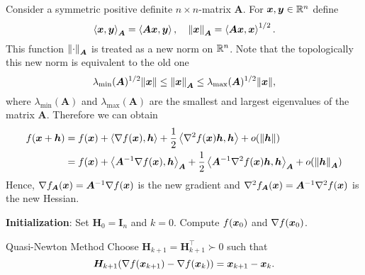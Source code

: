Consider a symmetric positive definite \(n \times n\)-matrix \(\bm{A}\). For \(\bm{x}, \bm{y} \in \mathbb{R}^n\) define 
\[
    \left\langle \bm{x}, \bm{y} \right\rangle_{\bm{A}} = \left\langle \bm{Ax}, \bm{y} \right\rangle, \quad \norm{\bm{x}}_{\bm{A}} = \left\langle \bm{Ax}, \bm{x} \right\rangle^{1/2}.  
\]
This function \(\norm{\cdot}_{\bm{A}}\) is treated as a new norm on \(\mathbb{R}^n\). Note that the topologically this new norm is equivalent to the 
old one
\[
    \lambda_{\min} (\bm{A})^{1/2}\norm{\bm{x}} \le \norm{\bm{x}}_{\bm{A}} \le  \lambda_{\max} (\bm{A})^{1/2}\norm{\bm{x}},
\]
where \(\lambda_{\min}(\bm{A})\) and \(\lambda_{\max}(\bm{A})\) are the smallest and largest eigenvalues of the matrix \(\bm{A}\). Therefore we can obtain
\[
    \begin{aligned}
        f(\xB + \hB) &= f(\xB) + \innerprod{\grad f(\xB)}{\hB} + \frac{1}{2} \innerprod{\hess f(\xB) \hB}{\hB} + o(\norm{\hB}) \\
        &= f(\xB) + \innerprod{\bm{A}^{-1}\grad f(\xB)}{\hB}_{\bm{A}} + \frac{1}{2} \innerprod{\bm{A}^{-1} \hess f(\xB) \hB}{\hB}_{\bm{A}} + o(\norm{\hB}_{\bm{A}})
    \end{aligned}  
\]
Hence, \(\nabla f_{\bm{A}}(\bm{x}) = \bm{A}^{-1} \nabla f(\bm{x})\) is the new gradient and \(\hess f_{\bm{A}}(\xB) = \bm{A}^{-1} \hess f(\xB)\) is the new Hessian.
\begin{algorithm}[!htbp]
    \caption{Variable Metric Method}\label{alg:variable-metric}
    \textbf{Initialization}: Set \(\bm{H}_0 = \bm{I}_n\) and \(k = 0\). Compute \(f(\bm{x}_0)\) and \(\nabla f(\bm{x}_0)\). \\
\end{algorithm}

\begin{boxnote}{Quasi-Newton Method}
    Choose \(\bm{H}_{k+1} = \bm{H}_{k+1}^\top \succ 0\) such that
    \[
        \bm{H}_{k+1}(\nabla f(\bm{x}_{k+1}) - \nabla f(\bm{x}_k)) = \bm{x}_{k+1} - \bm{x}_k.
    \] 
\end{boxnote}

